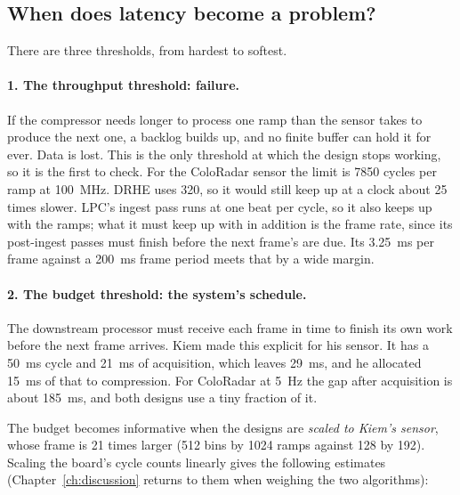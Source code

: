 \subsection{When does latency become a problem?}
\label{sec:hw_latproblem}

There are three thresholds, from hardest to softest.

\paragraph{1. The throughput threshold: failure.} If the compressor needs
longer to process one ramp than the sensor takes to produce the next one, a
backlog builds up, and no finite buffer can hold it for ever. Data is lost.
This is the only threshold at which the design stops working, so it is the
first to check. For the ColoRadar sensor the limit is \num{7850} cycles per
ramp at \SI{100}{\mega\hertz}. DRHE uses 320, so it would still keep up at a
clock about 25 times slower. LPC's ingest pass runs at one beat per cycle, so it
also keeps up with the ramps; what it must keep up with in addition is the frame
rate, since its post-ingest passes must finish before the next frame's are
due. Its \SI{3.25}{\milli\second} per frame against a \SI{200}{\milli\second}
frame period meets that by a wide margin.

\paragraph{2. The budget threshold: the system's schedule.} The downstream
processor must receive each frame in time to finish its own work before the
next frame arrives. Kiem made this explicit for his sensor. It has a
\SI{50}{\milli\second} cycle and \SI{21}{\milli\second} of acquisition, which
leaves \SI{29}{\milli\second}, and he allocated \SI{15}{\milli\second} of that
to compression. For ColoRadar at \SI{5}{\hertz} the gap after acquisition is
about \SI{185}{\milli\second}, and both designs use a tiny fraction of it.

The budget becomes informative when the designs are \emph{scaled to Kiem's
sensor}, whose frame is 21 times larger (512 bins by 1024 ramps against 128 by
192). Scaling the board's cycle counts linearly gives the following
estimates (Chapter~\ref{ch:discussion} returns to them when weighing the two
algorithms):


